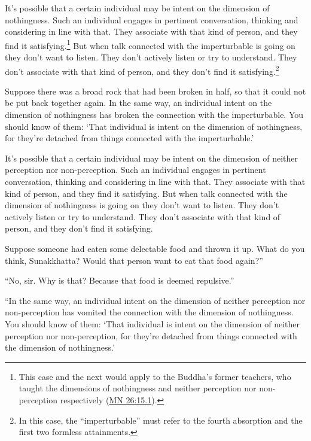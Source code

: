 \documentclass[12pt,openany]{book}%
\begin{document}
It’s possible that a certain individual may be intent on the dimension of nothingness. Such an individual engages in pertinent conversation, thinking and considering in line with that. They associate with that kind of person, and they find it satisfying.\footnote{This case and the next would apply to the Buddha’s former teachers, who taught the dimensions of nothingness and neither perception nor non-perception respectively (\href{https://suttacentral.net/mn26/en/sujato\#15.1}{MN 26:15.1}). } But when talk connected with the imperturbable is going on they don’t want to listen. They don’t actively listen or try to understand. They don’t associate with that kind of person, and they don’t find it satisfying.\footnote{In this case, the “imperturbable” must refer to the fourth absorption and the first two formless attainments. } 

Suppose there was a broad rock that had been broken in half, so that it could not be put back together again. In the same way, an individual intent on the dimension of nothingness has broken the connection with the imperturbable. You should know of them: ‘That individual is intent on the dimension of nothingness, for they’re detached from things connected with the imperturbable.’ 

It’s possible that a certain individual may be intent on the dimension of neither perception nor non-perception. Such an individual engages in pertinent conversation, thinking and considering in line with that. They associate with that kind of person, and they find it satisfying. But when talk connected with the dimension of nothingness is going on they don’t want to listen. They don’t actively listen or try to understand. They don’t associate with that kind of person, and they don’t find it satisfying. 

Suppose someone had eaten some delectable food and thrown it up. What do you think, Sunakkhatta? Would that person want to eat that food again?” 

“No, sir. Why is that? Because that food is deemed repulsive.” 

“In the same way, an individual intent on the dimension of neither perception nor non-perception has vomited the connection with the dimension of nothingness. You should know of them: ‘That individual is intent on the dimension of neither perception nor non-perception, for they’re detached from things connected with the dimension of nothingness.’ 
\end{document}

